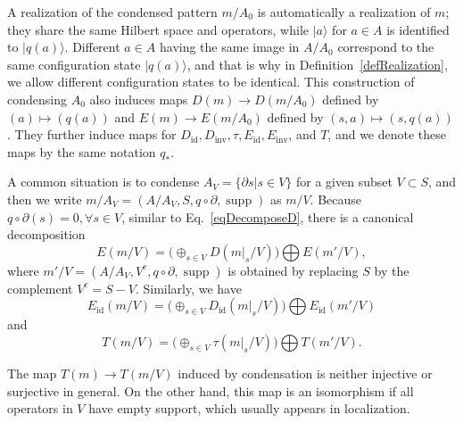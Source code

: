 \documentclass[reprint, amsmath, amssymb, showpacs, floatfix, longbibliography, aps, twocolumn, superscriptaddress, nofootinbib]{revtex4-2}
\newcommand{\supp}{\operatorname{supp}}
\newcommand{\id}{{\operatorname{id}}}
\newcommand{\inv}{{\operatorname{inv}}}
\theoremstyle{definition}
\begin{document}
A realization of the condensed pattern $m/A_0$ is automatically a realization of $m$; they share the same Hilbert space and operators, while $|a\rangle $ for $a\in A$ is identified to $|q(a)\rangle$. Different $a\in A$ having the same image in $A/A_0$ correspond to the same configuration state $|q(a)\rangle$, and that is why in Definition~\ref{defRealization}, we allow different configuration states to be identical. This construction of condensing $A_0$ also induces maps $D(m)\rightarrow D(m/A_0)$ defined by $(a)\mapsto (q(a))$ and $E(m)\rightarrow E(m/A_0)$ defined by $(s,a)\mapsto (s,q(a))$. They further induce maps for $D_\id,D_\inv,\tau,E_\id,E_\inv$, and $T$, and we denote these maps by the same notation $q_*$. 

A common situation is to condense $A_V=\{\partial s|s\in V\}$ for a given subset $V\subset S$, and then we write $m/A_V=(A/A_V,S,q\circ \partial,\supp)$ as $m/V$. Because $q\circ \partial(s)=0,\forall s\in V$, similar to Eq.~\eqref{eqDecomposeD}, there is a canonical decomposition
\begin{equation}\label{eqDecomposeE}
	E(m/V)=\big(\oplus_{s\in V}D(m|_s/V)\big)\bigoplus E(m'/V),
\end{equation}
where $m'/V=(A/A_V,V^c,q\circ \partial,\supp)$ is obtained by replacing $S$ by the complement $V^c=S-V$. Similarly, we have 
\begin{equation}\label{eqDecomposeEid}
	E_\id(m/V)=\big(\oplus_{s\in V}D_\id(m|_s/V)\big)\bigoplus E_\id(m'/V)
\end{equation}
and
\begin{equation}
	T(m/V)=\big(\oplus_{s\in V}\tau(m|_s/V)\big)\bigoplus T(m'/V).
\end{equation}

The map $T(m)\rightarrow T(m/V)$ induced by condensation is neither injective or surjective in general. On the other hand, this map is an isomorphism if all operators in $V$ have empty support, which usually appears in localization.
\end{document}
